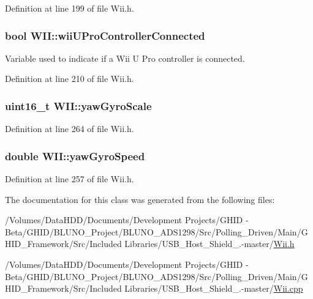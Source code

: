 \-Definition at line 199 of file \-Wii.\-h.

\hypertarget{class_w_i_i_a461f5b7a5f2bc874e107fc776c284b16}{
\subsubsection[{wii\-U\-Pro\-Controller\-Connected}]{\setlength{\rightskip}{0pt plus 5cm}bool {\bf \-W\-I\-I\-::wii\-U\-Pro\-Controller\-Connected}}}\label{class_w_i_i_a461f5b7a5f2bc874e107fc776c284b16}
\-Variable used to indicate if a \-Wii \-U \-Pro controller is connected. 

\-Definition at line 210 of file \-Wii.\-h.

\hypertarget{class_w_i_i_a0694969a30092b9b1dcb26120c7cff73}{
\subsubsection[{yaw\-Gyro\-Scale}]{\setlength{\rightskip}{0pt plus 5cm}uint16\-\_\-t {\bf \-W\-I\-I\-::yaw\-Gyro\-Scale}}}\label{class_w_i_i_a0694969a30092b9b1dcb26120c7cff73}


\-Definition at line 264 of file \-Wii.\-h.

\hypertarget{class_w_i_i_ad5df436cc5d073f26bf3ea5c60d788d6}{
\subsubsection[{yaw\-Gyro\-Speed}]{\setlength{\rightskip}{0pt plus 5cm}double {\bf \-W\-I\-I\-::yaw\-Gyro\-Speed}}}\label{class_w_i_i_ad5df436cc5d073f26bf3ea5c60d788d6}


\-Definition at line 257 of file \-Wii.\-h.



\-The documentation for this class was generated from the following files\-:\begin{DoxyCompactItemize}
\item 
/\-Volumes/\-Data\-H\-D\-D/\-Documents/\-Development Projects/\-G\-H\-I\-D -\/ Beta/\-G\-H\-I\-D/\-B\-L\-U\-N\-O\-\_\-\-Project/\-B\-L\-U\-N\-O\-\_\-\-A\-D\-S1298/\-Src/\-Polling\-\_\-\-Driven/\-Main/\-G\-H\-I\-D\-\_\-\-Framework/\-Src/\-Included Libraries/\-U\-S\-B\-\_\-\-Host\-\_\-\-Shield\-\_.-\/master/\hyperlink{_wii_8h}{\-Wii.\-h}\item 
/\-Volumes/\-Data\-H\-D\-D/\-Documents/\-Development Projects/\-G\-H\-I\-D -\/ Beta/\-G\-H\-I\-D/\-B\-L\-U\-N\-O\-\_\-\-Project/\-B\-L\-U\-N\-O\-\_\-\-A\-D\-S1298/\-Src/\-Polling\-\_\-\-Driven/\-Main/\-G\-H\-I\-D\-\_\-\-Framework/\-Src/\-Included Libraries/\-U\-S\-B\-\_\-\-Host\-\_\-\-Shield\-\_.-\/master/\hyperlink{_wii_8cpp}{\-Wii.\-cpp}\end{DoxyCompactItemize}
